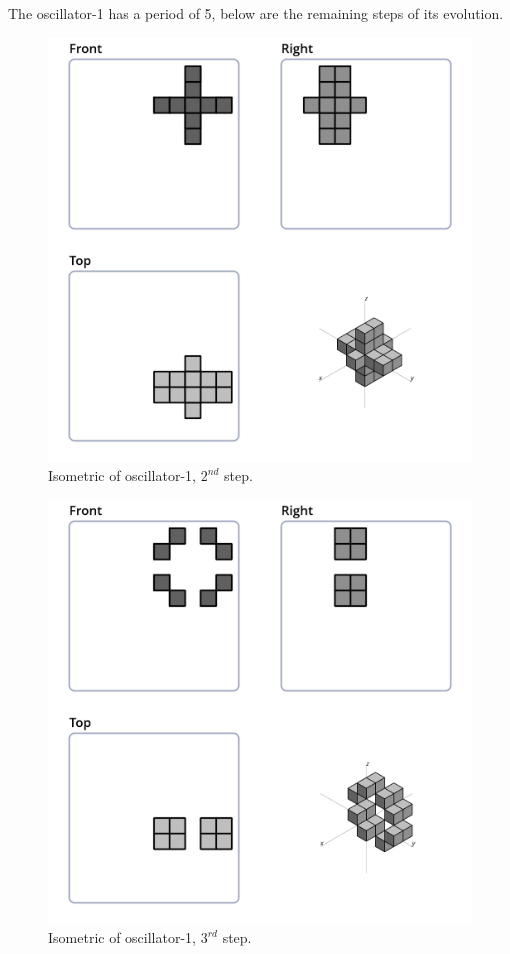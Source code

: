 The oscillator-1 has a period of 5, below are the remaining steps of its
evolution.

\begin{figure}[H]
  \centering
  \includegraphics[scale=0.532]{iso_settings/osc_1_2.png}
  \caption{Isometric of oscillator-1, $2^{nd}$ step.}
  \label{fig:iso-osc-1-2}
\end{figure}

\begin{figure}[H]
  \centering
  \includegraphics[scale=0.532]{iso_settings/osc_1_3.png}
  \caption{Isometric of oscillator-1, $3^{rd}$ step.}
  \label{fig:iso-osc-1-3}
\end{figure}

